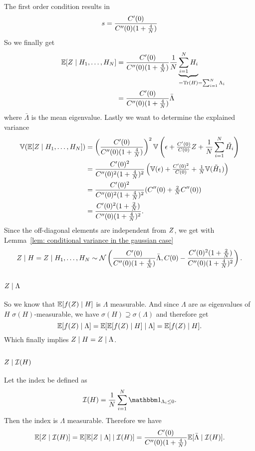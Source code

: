 The first order condition results in
\[
	s = \frac{C'(0)}{C''(0)(1+\tfrac4{N})}
\]
So we finally get
\begin{align*}
	\E[\rf\mid H_1,\dots,H_\dimension]
	&= \frac{\sqC'(0)}{\sqC''(0)(1+\tfrac4{\dimension})}
	\frac1\dimension\underbrace{\sum_{i=1}^\dimension H_i}_{
		=\trace(H) \mathrlap{=\sum_{i=1}^\dimension\Lambda_i}
	}\\
	&= \frac{\sqC'(0)}{\sqC''(0)(1+\tfrac4{\dimension})}
	\bar{\Lambda}
\end{align*}
where \(\bar{\Lambda}\) is the mean eigenvalue. Lastly we want to determine
the explained variance
\begin{align*}
	\mathbb{V}(\mathbb{E}[Z\mid H_1,\dots,H_N])
	&= \left(\frac{C'(0)}{C''(0)(1+\tfrac4{N})}\right)^2
	\mathbb{V}\left(
		\epsilon + \tfrac{C'(0)}{C(0)}Z + \frac{1}{N}\sum_{i=1}^N \tilde{H_i}
	\right)\\
	&= \frac{C'(0)^2}{C''(0)^2(1+\tfrac4{N})^2}
	\left(
		\mathbb{V}(\epsilon) + \tfrac{C'(0)^2}{C(0)} + \tfrac1{N}\mathbb{V}(\tilde{H}_1)
	\right)\\
	&= \frac{C'(0)^2}{C''(0)^2(1+\tfrac4{N})^2}
	(C''(0) + \tfrac2{N}C''(0))\\
	&= \frac{C'(0)^2(1+\tfrac2{N})}{C''(0)(1+\tfrac4{N})^2}.
\end{align*}
Since the off-diagonal elements are independent from \(Z\), we get with
Lemma~\ref{lem: conditional variance in the gaussian case}
\[
	Z\mid H = Z \mid H_1,\dots, H_N \sim \mathcal{N}\left(
		\frac{C'(0)}{C''(0)(1+\tfrac4{N})}\bar{\Lambda},
		C(0)-\frac{C'(0)^2(1+\tfrac2{N})}{C''(0)(1+\tfrac4{N})^2}
	\right).
\]

\subsection{\texorpdfstring{\(Z\mid \Lambda\)}{Z|Λ}}

So we know that \(\mathbb{E}[f(Z)\mid H]\) is \(\Lambda\)
measurable. And since \(\Lambda\) are as eigenvalues
of \(H\) \(\sigma(H)\)-measurable, we have \(\sigma(H)\supseteq \sigma(\Lambda)\)
and therefore get
\[
	\mathbb{E}[f(Z)\mid \Lambda]
	= \mathbb{E}[\mathbb{E}[f(Z)\mid H] \mid \Lambda]
	= \mathbb{E}[f(Z)\mid H].
\]
Which finally implies \(Z\mid H = Z\mid \Lambda\).

\subsection{\texorpdfstring{\(Z\mid\mathcal{I}(H)\)}{Z|I(H)}}

Let the index be defined as
\[
	\negEV(H)=\frac1{\dimension}\sum_{i=1}^\dimension \ind_{\Lambda_i \le 0}.
\]
Then the index is \(\Lambda\) measurable. Therefore we have
\[
	\mathbb{E}[Z\mid \mathcal{I}(H)]
	= \mathbb{E}[\mathbb{E}[Z\mid \Lambda]\mid \mathcal{I}(H)]
	= \frac{C'(0)}{C''(0)(1+\tfrac4{N})}
	\mathbb{E}[\bar{\Lambda}\mid \mathcal{I}(H)].
\]

